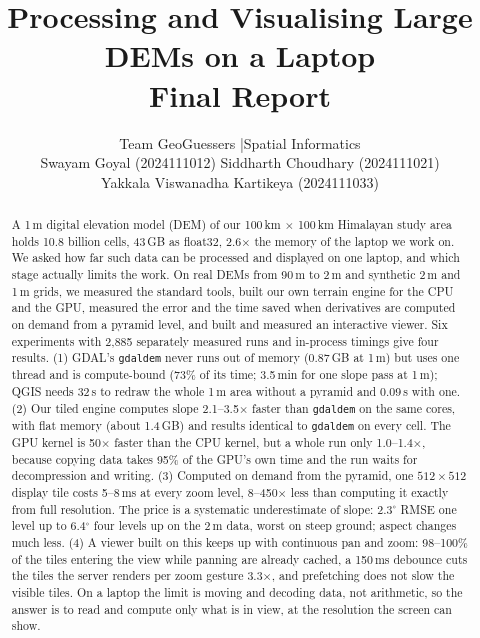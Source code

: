 \documentclass[11pt,a4paper]{article}
\title{\textbf{Processing and Visualising Large DEMs on a Laptop}\\[4pt]
\large Final Report}
\author{Team GeoGuessers \quad|\quad Spatial Informatics\\[4pt]
Swayam Goyal (2024111012) \quad Siddharth Choudhary (2024111021)\\
Yakkala Viswanadha Kartikeya (2024111033)}
\date{}
\begin{document}
\maketitle

\begin{abstract}
\noindent
A 1\,m digital elevation model (DEM) of our 100\,km $\times$ 100\,km Himalayan study area holds 10.8 billion cells,
43\,GB as float32, 2.6$\times$ the memory of the laptop we work on. We asked how far such data can be processed and
displayed on one laptop, and which stage actually limits the work. On real DEMs from 90\,m to 2\,m and synthetic 2\,m
and 1\,m grids, we measured the standard tools, built our own terrain engine for the CPU and the GPU, measured the
error and the time saved when derivatives are computed on demand from a pyramid level, and built and measured an
interactive viewer. Six experiments with 2{,}885 separately measured runs and in-process timings give four results.
(1) GDAL's \texttt{gdaldem} never runs out of memory (0.87\,GB at 1\,m) but uses one thread and is compute-bound
(73\% of its time; 3.5\,min for one slope pass at 1\,m); QGIS needs 32\,s to redraw the whole 1\,m area without a
pyramid and 0.09\,s with one. (2) Our tiled engine computes slope 2.1--3.5$\times$ faster than \texttt{gdaldem} on
the same cores, with flat memory (about 1.4\,GB) and results identical to \texttt{gdaldem} on every cell. The GPU
kernel is 50$\times$ faster than the CPU kernel, but a whole run only 1.0--1.4$\times$, because copying data
takes 95\% of the GPU's own time and the run waits for decompression and writing. (3) Computed on demand from the
pyramid, one $512\times512$ display tile costs 5--8\,ms at every zoom level, 8--450$\times$ less than computing it
exactly from full resolution. The price is a systematic underestimate of slope: 2.3$^\circ$ RMSE one level up to
6.4$^\circ$ four levels up on the 2\,m data, worst on steep ground; aspect changes much less. (4) A viewer built on
this keeps up with continuous pan and zoom: 98--100\% of the tiles entering the view while panning are already
cached, a 150\,ms debounce cuts the tiles the server renders per zoom gesture 3.3$\times$, and prefetching does not
slow the visible tiles. On a laptop the limit is moving and decoding data, not arithmetic, so the answer is to read
and compute only what is in view, at the resolution the screen can show.
\end{abstract}

\setcounter{tocdepth}{1}
\makeatletter %
\let\gg@oldlsection\l@section
\renewcommand*\l@section[2]{{\def\addvspace##1{\vspace{2pt}}\gg@oldlsection{#1}{#2}}}
\makeatother
\tableofcontents
\newpage
\end{document}
